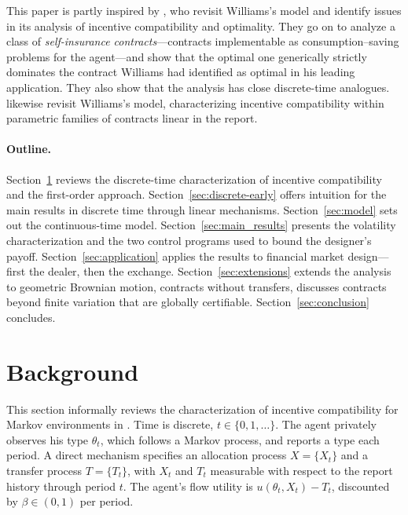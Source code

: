 \documentclass[12pt]{article}
\begin{document}
This paper is partly inspired by \citet{bloedel2023persistent}, who revisit
Williams's model and identify issues in its analysis of incentive compatibility
and optimality. They go on to analyze a class of \emph{self-insurance
contracts}---contracts implementable as consumption--saving problems for the
agent---and show that the optimal one generically strictly dominates the contract
Williams had identified as optimal in his leading application. They also show that
the analysis has close discrete-time analogues. \citet{acciaio2023note} likewise
revisit Williams's model, characterizing incentive compatibility within parametric
families of contracts linear in the report.



\paragraph{Outline.}
Section~\ref{sec:background} reviews the discrete-time characterization
of incentive compatibility and the first-order approach.
Section~\ref{sec:discrete-early} offers intuition for the main results in
discrete time through linear mechanisms. Section~\ref{sec:model} sets out
the continuous-time model. Section~\ref{sec:main_results} presents the
volatility characterization and the two control programs used to bound
the designer's payoff. Section~\ref{sec:application} applies the results
to financial market design---first the dealer, then the exchange.
Section~\ref{sec:extensions} extends the analysis to geometric Brownian
motion, contracts without transfers, discusses contracts beyond finite variation that are globally certifiable. Section~\ref{sec:conclusion} concludes.

\section{Background}\label{sec:background}

This section informally reviews the characterization of incentive
compatibility for Markov environments in \citet{pavan2014dynamic}. Time is discrete,
\(t\in\{0,1,\dots\}\). The agent privately observes his type
\(\theta_t\), which follows a Markov process, and reports a type each
period.  A direct mechanism specifies an allocation
process \(X=\{X_t\}\) and a transfer process \(T=\{T_t\}\), with
\(X_t\) and \(T_t\) measurable with respect to the report history
through period \(t\). The agent's flow utility is
\(u(\theta_t,X_t)-T_t\), discounted by \(\beta\in(0,1)\) per period.
\end{document}
